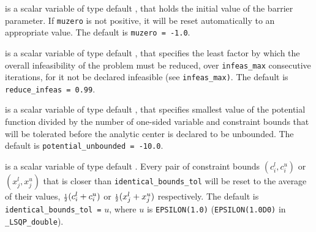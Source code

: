 \documentclass{galahad}
\newcommand{\packagename}{LSQP}
\newcommand{\fullpackagename}{\libraryname\_\-\packagename}
\begin{document}
\begin{description}
  is a scalar variable of type default \realdp, that holds the
initial value of the barrier parameter. If {\tt muzero} is
not positive, it will be reset automatically to an appropriate value.
The default is {\tt muzero = -1.0}.

  is a scalar variable of type default 
\realdp, that specifies the
least factor by which the overall infeasibility of the problem must be reduced,
over {\tt infeas\_max} consecutive iterations, 
for it not be declared infeasible (see {\tt infeas\_max)}.
The default is {\tt reduce\_infeas = 0.99}.

  is a scalar variable of type default 
\realdp, that specifies smallest
value of the potential function divided by the number of one-sided variable and
constraint bounds that will be tolerated before the analytic center is 
declared to be unbounded.
The default is {\tt potential\_u\-nbounded = -10.0}.




is a scalar variable of type default \realdp.
Every pair of constraint bounds 
$(c_{i}^{l}, c_{i}^{u})$ or $(x_{j}^{l}, x_{j}^{u})$
that is closer than {\tt identical\_bounds\_tol} 
will be reset to the average of their values,
${\scriptstyle \frac{1}{2}} (c_{i}^{l} + c_{i}^{u})$ or ${\scriptstyle \frac{1}{2}} (x_{j}^{l} + x_{j}^{u})$
respectively.
The default is {\tt identical\_bounds\_tol =} $u$,
where $u$ is {\tt EPSILON(1.0)} ({\tt EPSILON(1.0D0)} in 
{\tt \fullpackagename\_double}).


\end{description}
\end{document}
